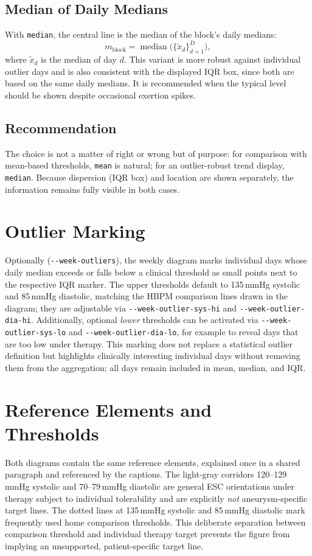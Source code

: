 \documentclass[conference]{IEEEtran}
\newcommand{\param}[1]{\texttt{#1}}
\begin{document}
\subsection{Median of Daily Medians}
With \texttt{median}, the central line is the median of the block's daily
medians:
\begin{equation}
m_{\mathrm{block}} = \operatorname{median}\bigl(\{\tilde{x}_d\}_{d=1}^{D}\bigr),
\end{equation}
where $\tilde{x}_d$ is the median of day $d$. This variant is more robust
against individual outlier days and is also consistent with the displayed IQR
box, since both are based on the same daily medians. It is recommended when the
typical level should be shown despite occasional exertion spikes.

\subsection{Recommendation}
The choice is not a matter of right or wrong but of purpose: for comparison with
mean-based thresholds, \texttt{mean} is natural; for an outlier-robust trend
display, \texttt{median}. Because dispersion (IQR box) and location are shown
separately, the information remains fully visible in both cases.

\section{Outlier Marking}
Optionally (\param{-{}-week-outliers}), the weekly diagram marks individual days
whose daily median exceeds or falls below a clinical threshold as small points
next to the respective IQR marker. The upper thresholds default to 135\,mmHg
systolic and 85\,mmHg diastolic, matching the HBPM comparison lines drawn in the
diagram; they are adjustable via \param{-{}-week-outlier-sys-hi} and
\param{-{}-week-outlier-dia-hi}. Additionally, optional \emph{lower} thresholds
can be activated via \param{-{}-week-outlier-sys-lo} and
\param{-{}-week-outlier-dia-lo}, for example to reveal days that are too low
under therapy. This marking does not replace a statistical outlier definition
but highlights clinically interesting individual days without removing them from
the aggregation; all days remain included in mean, median, and IQR.

\section{Reference Elements and Thresholds}
Both diagrams contain the same reference elements, explained once in a shared
paragraph and referenced by the captions. The light-gray corridors
120--129\,mmHg systolic and 70--79\,mmHg diastolic are general ESC orientations
under therapy subject to individual tolerability and are explicitly \emph{not}
aneurysm-specific target lines. The dotted lines at 135\,mmHg systolic and
85\,mmHg diastolic mark frequently used home comparison thresholds. This
deliberate separation between comparison threshold and individual therapy target
prevents the figure from implying an unsupported, patient-specific target line.
\end{document}
